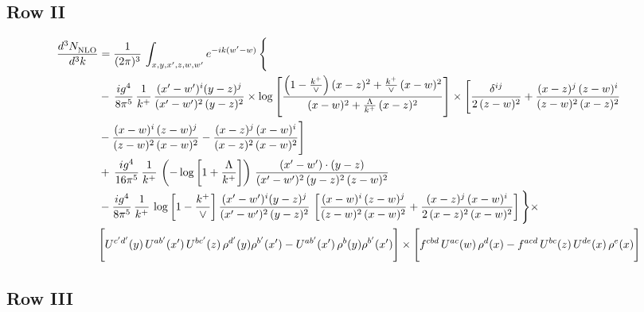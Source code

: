 \documentclass[9pt]{article}
\numberwithin{equation}{section}
\begin{document}
\subsection{Row II}
\begin{align}
     \frac{d^{3}N_{\rm NLO}^{\rm}}{d^{3}k}  & =  \frac{1}{(2\pi)^{3}}\, \int_{x,y,x',z,w,w^{\prime}} e^{-ik(w^{\prime}-w)}\, \Bigg\{\notag \\ & -\,\frac{ig^{4}}{8\pi^{5}}\,\frac{1}{k^{+}}\,\frac{(x'-w')^{i}(y-z)^{j}}{(x'-w')^{2}\,(y-z)^{2}}\times \log{\left[\frac{\left(1-\frac{k^{+}}{\vee}\right)(x-z)^{2}+\frac{k^{+}}{\vee}\,(x-w)^{2}}{(x-w)^{2}+\frac{\Lambda}{k^{+}}\,(x-z)^{2}}\right]}\times \Bigg[\frac{\delta^{ij}}{2\,(z-w)^{2}}+\frac{(x-z)^{j}\,(z-w)^{i}}{(z-w)^{2}\,(x-z)^{2}}\notag \\ & -\frac{(x-w)^{i}\,(z-w)^{j}}{(z-w)^{2}\,(x-w)^{2}}-\frac{(x-z)^{j}\,(x-w)^{i}}{(x-z)^{2}\,(x-w)^{2}}\Bigg]\notag \\ & +\,\frac{ig^{4}}{16\pi^{5}}\,\frac{1}{k^{+}}\,\left(-\log{\left[1+\frac{\Lambda}{k^{+}}\right]}\right)\, \frac{(x'-w')\cdot (y-z)}{(x'-w')^{2}\,(y-z)^{2}\,(z-w)^{2}}\notag \\ & -\frac{ig^{4}}{8\pi^{5}}\,\frac{1}{k^{+}}\, \log{\left[1-\frac{k^{+}}{\vee}\right]}\,\frac{(x'-w')^{i}(y-z)^{j}}{(x'-w')^{2}\,(y-z)^{2}}\,\left[\frac{(x-w)^{i}\,(z-w)^{j}}{(z-w)^{2}\,(x-w)^{2}}+\frac{(x-z)^{j}\,(x-w)^{i}}{2\,(x-z)^{2}\, (x-w)^{2}}\right]\Bigg\}\times \notag \\ & \Bigg[U^{c'd'}(y)\,U^{ab'}(x')\,U^{bc'}(z)\,\rho^{d'}(y)\rho^{b'}(x')-U^{ab'}(x')\,\rho^{b}(y)\rho^{b'}(x')\Bigg]\times\Bigg[f^{cbd}\,U^{ac}(w)\,\rho^{d}(x)-f^{acd}\, U^{bc}(z)\,U^{de}(x)\,\rho^{e}(x)\Bigg]
\end{align}
 \subsection{Row III}
\end{document}

